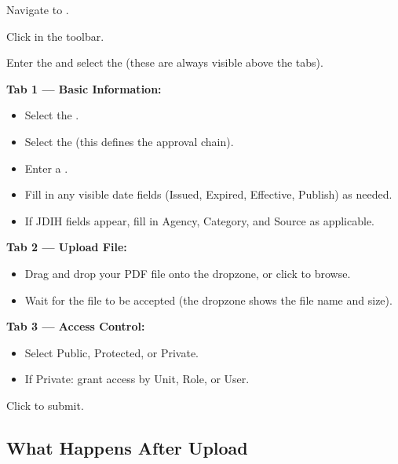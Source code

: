 \begin{ugSteps}
  \item Navigate to .
  \item Click  in the toolbar.
  \item Enter the  and select the
         (these are always visible above the
        tabs).
  \item \textbf{Tab 1 --- Basic Information:}
    \begin{itemize}[leftmargin=14pt]
      \item Select the .
      \item Select the  (this defines
            the approval chain).
      \item Enter a .
      \item Fill in any visible date fields (Issued, Expired,
            Effective, Publish) as needed.
      \item If JDIH fields appear, fill in Agency, Category,
            and Source as applicable.
    \end{itemize}
  \item \textbf{Tab 2 --- Upload File:}
    \begin{itemize}[leftmargin=14pt]
      \item Drag and drop your PDF file onto the dropzone, or
            click to browse.
      \item Wait for the file to be accepted (the dropzone
            shows the file name and size).
    \end{itemize}
  \item \textbf{Tab 3 --- Access Control:}
    \begin{itemize}[leftmargin=14pt]
      \item Select Public, Protected, or Private.
      \item If Private: grant access by Unit, Role, or User.
    \end{itemize}
  \item Click  to submit.
\end{ugSteps}

\subsection{What Happens After Upload}

